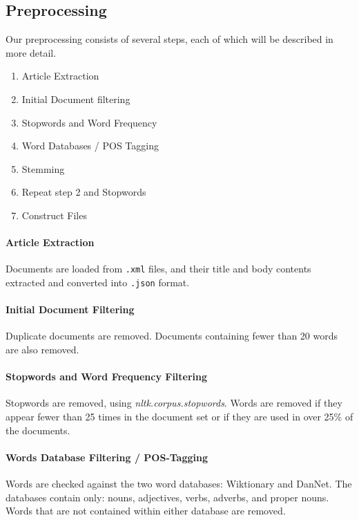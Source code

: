 \subsection{Preprocessing}\label{subsec:prepro}

Our preprocessing consists of several steps, each of which will be described in more detail.

\begin{enumerate}
	\item Article Extraction
	\item Initial Document filtering
	\item Stopwords and Word Frequency
	\item Word Databases / POS Tagging
	\item Stemming
	\item Repeat step 2 and Stopwords
	\item Construct Files
\end{enumerate}

\paragraph{Article Extraction}
Documents are loaded from \texttt{.xml} files, and their title and body contents extracted and converted into \texttt{.json} format.

\paragraph{Initial Document Filtering}
Duplicate documents are removed. Documents containing fewer than 20 words are also removed.

\paragraph{Stopwords and Word Frequency Filtering}
Stopwords are removed, using \emph{nltk.corpus.stopwords}. 
Words are removed if they appear fewer than 25 times in the document set or if they are used in over 25\% of the documents.

\paragraph{Words Database Filtering / POS-Tagging}
Words are checked against the two word databases: Wiktionary and DanNet. 
The databases contain only: nouns, adjectives, verbs, adverbs, and proper nouns. 
Words that are not contained within either database are removed.

